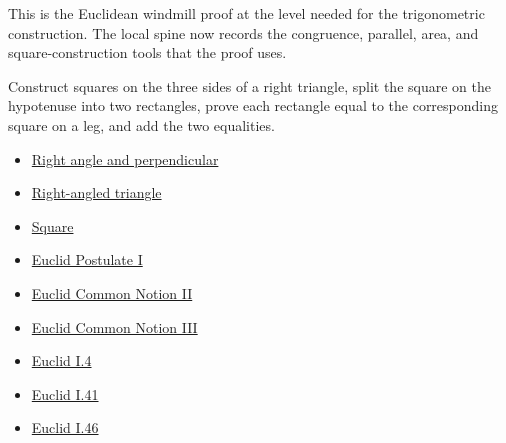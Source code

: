 \begin{remark*}
This is the Euclidean windmill proof at the level needed for the trigonometric
construction. The local spine now records the congruence, parallel, area, and
square-construction tools that the proof uses.
\end{remark*}

\begin{remark*}
Construct squares on the three sides of a right triangle, split the square on
the hypotenuse into two rectangles, prove each rectangle equal to the
corresponding square on a leg, and add the two equalities.
\end{remark*}

\begin{dependencies}
\begin{itemize}
  \item \hyperref[def:euclid-right-angle-and-perpendicular]{Right angle and perpendicular}
  \item \hyperref[def:euclid-triangle-angle-classes]{Right-angled triangle}
  \item \hyperref[def:euclid-quadrilateral-classes]{Square}
  \item \hyperref[ax:euclid-postulate-draw-straight-line]{Euclid Postulate I}
  \item \hyperref[ax:euclid-common-notion-add-equals]{Euclid Common Notion II}
  \item \hyperref[ax:euclid-common-notion-subtract-equals]{Euclid Common Notion III}
  \item \hyperref[thm:euclid-i-4]{Euclid I.4}
  \item \hyperref[thm:euclid-i-41]{Euclid I.41}
  \item \hyperref[thm:euclid-i-46]{Euclid I.46}
\end{itemize}
\end{dependencies}

\clearpage
